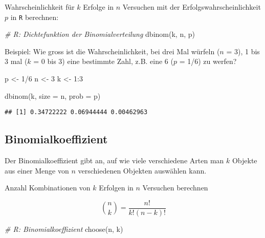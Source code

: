 \documentclass[
]{book}
\newenvironment{Shaded}{\begin{snugshade}}{\end{snugshade}}
\newcommand{\AttributeTok}[1]{\textcolor[rgb]{0.77,0.63,0.00}{#1}}
\newcommand{\CommentTok}[1]{\textcolor[rgb]{0.56,0.35,0.01}{\textit{#1}}}
\newcommand{\DecValTok}[1]{\textcolor[rgb]{0.00,0.00,0.81}{#1}}
\newcommand{\FunctionTok}[1]{\textcolor[rgb]{0.00,0.00,0.00}{#1}}
\newcommand{\NormalTok}[1]{#1}
\newcommand{\OtherTok}[1]{\textcolor[rgb]{0.56,0.35,0.01}{#1}}
\newcommand{\SpecialCharTok}[1]{\textcolor[rgb]{0.00,0.00,0.00}{#1}}
\begin{document}
Wahrscheinlichkeit für \(k\) Erfolge in \(n\) Versuchen mit der Erfolgswahrscheinlichkeit \(p\) in \texttt{R} berechnen:

\begin{Shaded}
\begin{Highlighting}[]
\CommentTok{\# R: Dichtefunktion der Binomialverteilung}
\FunctionTok{dbinom}\NormalTok{(k, n, p)}
\end{Highlighting}
\end{Shaded}

Beispiel: Wie gross ist die Wahrscheinlichkeit, bei drei Mal würfeln (\(n\) = 3), 1 bis 3 mal (\(k\) = 0 bis 3) eine bestimmte Zahl, z.B. eine 6 (\(p\) = 1/6) zu werfen?

\begin{Shaded}
\begin{Highlighting}[]
\NormalTok{p }\OtherTok{\textless{}{-}} \DecValTok{1}\SpecialCharTok{/}\DecValTok{6}
\NormalTok{n }\OtherTok{\textless{}{-}} \DecValTok{3}
\NormalTok{k }\OtherTok{\textless{}{-}} \DecValTok{1}\SpecialCharTok{:}\DecValTok{3}

\FunctionTok{dbinom}\NormalTok{(k, }\AttributeTok{size =}\NormalTok{ n, }\AttributeTok{prob =}\NormalTok{ p)}
\end{Highlighting}
\end{Shaded}

\begin{verbatim}
## [1] 0.34722222 0.06944444 0.00462963
\end{verbatim}

\hypertarget{binomialkoeffizient}{%
\subsection{Binomialkoeffizient}\label{binomialkoeffizient}}

Der Binomialkoeffizient gibt an, auf wie viele verschiedene Arten man \(k\) Objekte aus einer Menge von \(n\) verschiedenen Objekten auswählen kann.

Anzahl Kombinationen von \(k\) Erfolgen in \(n\) Versuchen berechnen

\begin{equation}
 {n \choose k} = \frac{n!}{k!(n-k)!}
 \label{eq:binomkoef}
\end{equation}

\begin{Shaded}
\begin{Highlighting}[]
\CommentTok{\# R: Binomialkoeffizient}
\FunctionTok{choose}\NormalTok{(n, k)}
\end{Highlighting}
\end{Shaded}
\end{document}
